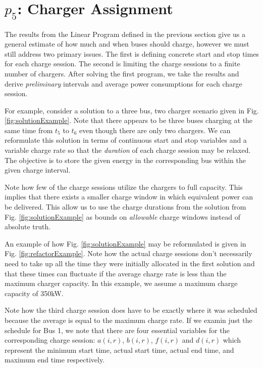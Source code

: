 



\section{$p_5$: Charger Assignment\label{sec:chargerAssignment}}
The results from the Linear Program defined in the previous section give us a general estimate of how much and when buses should charge, however we must still address two primary issues. The first is defining concrete start and stop times for each charge session. The second is limiting the charge sessions to a finite number of chargers. After solving the first program, we take the results and derive {\it preliminary} intervals and average power consumptions for each charge session.  
\par For example, consider a solution to a three bus, two charger scenario given in Fig. \ref{fig:solutionExample}.
Note that there appears to be three buses charging at the same time from $t_5$ to $t_6$ even though there are only two chargers.  We can reformulate this solution in terms of continuous start and stop variables and a variable charge rate so that the {\it duration} of each charge session may be relaxed. The objective is to store the given energy in the corresponding bus within the given charge interval.  
\par Note how few of the charge sessions utilize the chargers to full capacity. This implies that there exists a smaller charge window in which equivalent power can be delivered. This allow us to use the charge durations from the solution from Fig. \ref{fig:solutionExample} as bounds on {\it allowable} charge windows instead of absolute truth. 
\par An example of how Fig. \ref{fig:solutionExample} may be reformulated is given in Fig. \ref{fig:refactorExample}. Note how the actual charge sessions don't necessarily need to take up all the time they were initially allocated in the first solution and that these times can fluctuate if the average charge rate is less than the maximum charger capacity. In this example, we assume a maximum charge capacity of 350kW.  
\par Note how the third charge session does have to be exactly where it was scheduled because the average is equal to the maximum charge rate.
If we examin just the schedule for Bus 1, we note that there are four essential variables for the corresponding charge session: $a(i,r)$, $b(i,r)$, $f(i,r)$ and $d(i,r)$ which represent the minimum start time, actual start time, actual end time, and maximum end time respectively. 
